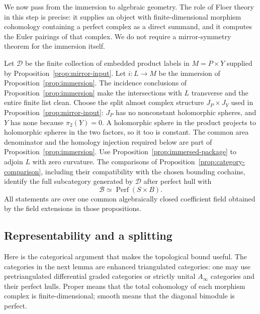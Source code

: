 \documentclass[11pt]{article}
\numberwithin{equation}{section}
\theoremstyle{definition}
\theoremstyle{remark}
\newcommand{\Perf}{\operatorname{Perf}}
\begin{document}
We now pass from the immersion to algebraic geometry.  The role of Floer
theory in this step is precise: it supplies an object with finite-dimensional
morphism cohomology containing a perfect complex as a direct summand,
and it computes the
Euler pairings of that complex.  We do not require a mirror-symmetry
theorem for the immersion itself.

Let $\mathcal D$ be the finite collection of embedded product labels in
$M=P\times Y$ supplied by Proposition~\ref{prop:mirror-input}.  Let
$i:L\to M$ be the immersion of Proposition~\ref{prop:immersion}.
The incidence conclusions of Proposition~\ref{prop:immersion} make
the intersections with $L$ transverse and the entire finite list clean.
Choose the split almost complex structure $J_P\times J_Y$ used in
Proposition~\ref{prop:mirror-input}: $J_P$ has no nonconstant holomorphic
spheres, and $Y$ has none because $\pi_2(Y)=0$.  A holomorphic sphere
in the product projects to holomorphic spheres in the two factors,
so it too is constant.  The common area denominator and the homology
injection required below are part of Proposition~\ref{prop:immersion}.
Use Proposition~\ref{prop:immersed-package} to adjoin
$L$ with zero curvature.  The comparisons of
Proposition~\ref{prop:category-comparison}, including their compatibility
with the chosen bounding cochains, identify the full subcategory
generated by $\mathcal D$ after perfect hull with
\[
                  \mathcal B\simeq\Perf(S\times B).
\]
All statements are over one common algebraically closed coefficient field
obtained by the field extensions in those propositions.

\subsection{Representability and a splitting}

Here is the categorical argument that makes the topological bound useful.
The categories in the next lemma are enhanced triangulated categories:
one may use pretriangulated differential graded categories or strictly
unital $A_\infty$ categories and their perfect hulls.  Proper means that
the total cohomology of each morphism complex is finite-dimensional;
smooth means that the diagonal bimodule is perfect.
\end{document}

